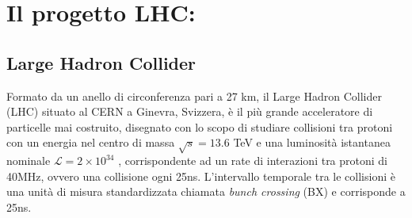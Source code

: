 \chapter{Il progetto LHC:}

\sloppy
\section{Large Hadron Collider}
\label{sec:LHC}
Formato da un anello di circonferenza pari a 27 km, il Large Hadron Collider (LHC) situato al CERN a Ginevra, Svizzera, è il più grande acceleratore di particelle mai costruito, disegnato con lo scopo di studiare collisioni tra protoni con un energia nel centro di massa $\sqrt{s} = 13.6$ TeV e una luminosità istantanea nominale $\mathcal{L} = 2 \times 10^{34}$ \Lumi, corrispondente ad un rate di interazioni tra protoni di 40MHz, ovvero una collisione ogni 25ns. L'intervallo temporale tra le collisioni è una unità di misura standardizzata chiamata \textit{bunch crossing} (BX) e corrisponde a 25ns.

